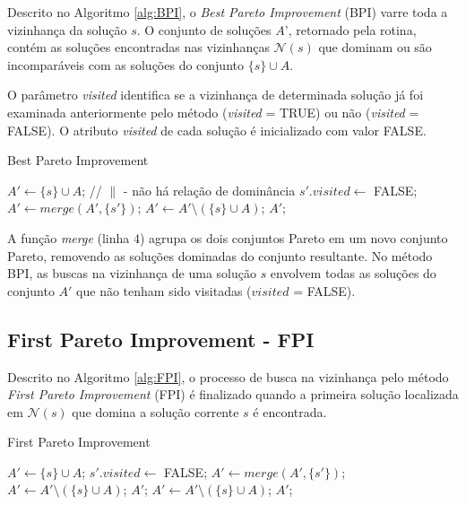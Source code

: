 \documentclass[
	12pt,				%
	openany,			%
	oneside,	
	a4paper,			%
	brazil,				%
	]{unimontes-ppgmsc-abntex2}
\begin{document}
Descrito no Algoritmo \ref{alg:BPI}, o {\em Best Pareto Improvement} (BPI) varre toda a vizinhança da solução $s$. O conjunto de soluções $A’$, retornado pela rotina, contém as soluções encontradas nas vizinhanças $\mathcal{N}(s)$ que dominam ou são incomparáveis com as soluções do conjunto $\{s\} \cup A$. 

O parâmetro {\em visited} identifica se a vizinhança de determinada solução já foi examinada anteriormente pelo método ({\em visited} = TRUE) ou não ({\em visited} = FALSE). O atributo {\em visited} de cada solução é inicializado com valor FALSE.

\begin{algorithm}[H]
\caption{Best Pareto Improvement}
\label{alg:BPI}
\begin{algorithmic}[1]
\State $A' \leftarrow \{s\} \cup A$;
   // $\parallel$ - \small{não há relação de dominância}
    \State $s'.visited \leftarrow$ FALSE;
    \State $A' \leftarrow merge(A', \{s'\})$;
  \EndIf
\EndFor
\State $A' \leftarrow A' \setminus (\{s\} \cup A)$;
\State \Return $A'$;
\end{algorithmic}
\end{algorithm}

A função {\em merge} (linha 4) agrupa os dois conjuntos Pareto em um novo conjunto Pareto, removendo as soluções dominadas do conjunto resultante. No método BPI, as buscas na vizinhança de uma solução $s$ envolvem todas as soluções do conjunto $A'$ que não tenham sido visitadas ($visited$ = FALSE).

\subsection{First Pareto Improvement - FPI} 

Descrito no Algoritmo \ref{alg:FPI}, o processo de busca na vizinhança pelo método {\em First Pareto Improvement} (FPI) é finalizado quando a primeira solução localizada em $\mathcal{N}(s)$ que domina a solução corrente $s$ é encontrada.

\begin{algorithm}[H]
\caption{First Pareto Improvement}
\label{alg:FPI}
\begin{algorithmic}[1]
\State $A' \leftarrow \{s\} \cup A$;
	\State $s'.visited\leftarrow$ FALSE;
    \State $A' \leftarrow merge(A', \{s'\})$;
      \State $A' \leftarrow A' \setminus (\{s\} \cup A)$;
      \State \Return $A'$;
    \EndIf
  \EndIf
\EndFor
\State $A' \leftarrow A' \setminus (\{s\} \cup A)$;
\State \Return $A'$;
\end{algorithmic}
\end{algorithm}
\end{document}
